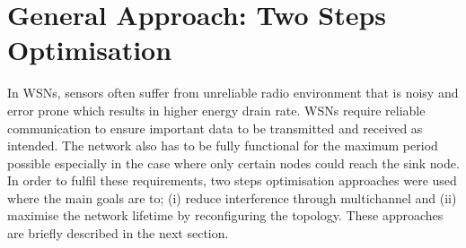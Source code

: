 \section{General Approach: Two Steps Optimisation}
\label{ProblemFormulation}

In WSNs, sensors often suffer from unreliable radio environment that is noisy and error prone which results in higher energy drain rate. 
WSNs require reliable communication to ensure important data to be transmitted and received as intended.
The network also has to be fully functional for the maximum period possible especially in the case where only certain nodes could reach the sink node.
In order to fulfil these requirements, two steps optimisation approaches were used where the main goals are to;
(i) reduce interference through multichannel and (ii) maximise the network lifetime by reconfiguring the topology. These approaches are briefly described in the next section.





